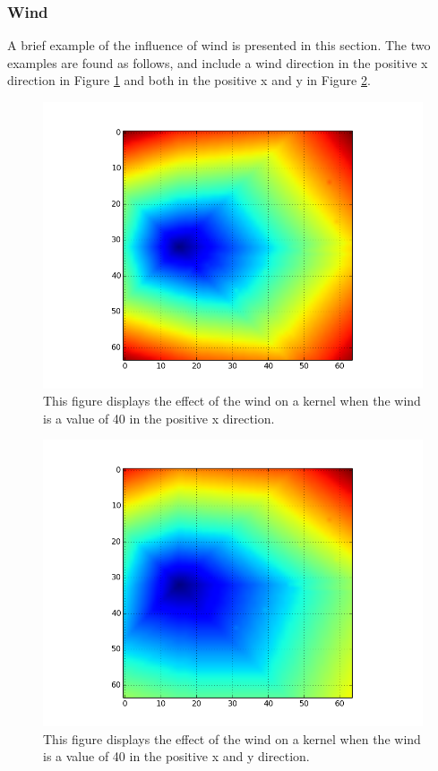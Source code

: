 \subsubsection{Wind}\label{sec:wind}
A brief example of the influence of wind is presented in this section. The two examples are found as follows, and include a wind direction in the positive x direction in Figure \ref{fig:wind} and both in the positive x and y in Figure \ref{fig:wind_both}. 
\begin{figure}%
\centering
  \includegraphics[height=.4\textheight]{figures/results/40_wind.png}
  \caption{This figure displays the effect of the wind on a kernel when the wind is a value of 40 in the positive x direction.}
  \label{fig:wind}
\end{figure}  
\begin{figure}%
\centering
  \includegraphics[height=.4\textheight]{figures/results/40_40_wind.png}
  \caption{This figure displays the effect of the wind on a kernel when the wind is a value of 40 in the positive x and y direction.}
  \label{fig:wind_both}
\end{figure} 

